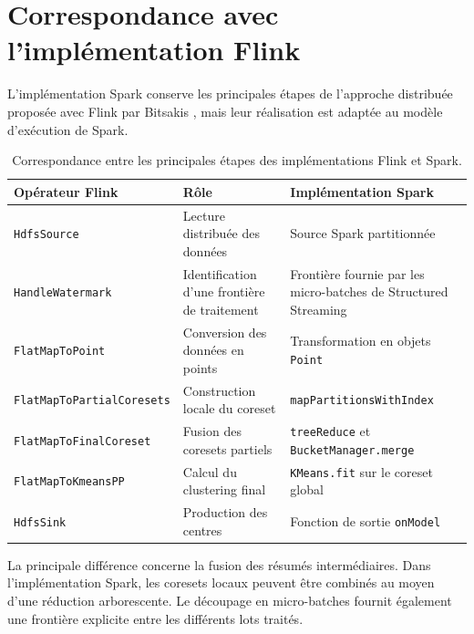 \section{Correspondance avec l'implémentation Flink}

L'implémentation Spark conserve les principales étapes de l'approche distribuée proposée avec Flink par Bitsakis \cite{bitsakis2018}, mais leur réalisation est adaptée au modèle d'exécution de Spark.

\begin{table}[ht]
\centering
\small
\begin{tabular}{p{3.5cm}p{4.5cm}p{4.8cm}}
\toprule
\textbf{Opérateur Flink} &
\textbf{Rôle} &
\textbf{Implémentation Spark} \\
\midrule

\texttt{HdfsSource} &
Lecture distribuée des données &
Source Spark partitionnée \\

\texttt{HandleWatermark} &
Identification d'une frontière de traitement &
Frontière fournie par les micro-batches de Structured Streaming \\

\texttt{FlatMapToPoint} &
Conversion des données en points &
Transformation en objets \texttt{Point} \\

\texttt{FlatMapToPartialCoresets} &
Construction locale du coreset &
\texttt{mapPartitionsWithIndex} \\

\texttt{FlatMapToFinalCoreset} &
Fusion des coresets partiels &
\texttt{treeReduce} et \texttt{BucketManager.merge} \\

\texttt{FlatMapToKmeansPP} &
Calcul du clustering final &
\texttt{KMeans.fit} sur le coreset global \\

\texttt{HdfsSink} &
Production des centres &
Fonction de sortie \texttt{onModel} \\

\bottomrule
\end{tabular}
\caption{Correspondance entre les principales étapes des implémentations Flink et Spark.}
\label{tab:flink-spark}
\end{table}

La principale différence concerne la fusion des résumés intermédiaires. Dans l'implémentation Spark, les coresets locaux peuvent être combinés au moyen d'une réduction arborescente. Le découpage en micro-batches fournit également une frontière explicite entre les différents lots traités.

